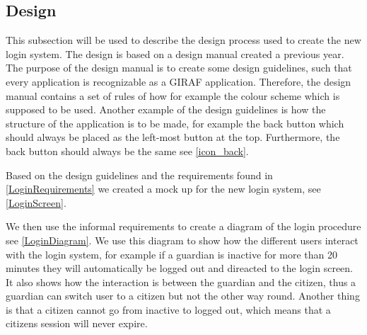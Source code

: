 \subsection{Design}

This subsection will be used to describe the design process used to create the
new login system. The design is based on a design manual created a previous
year. The purpose of the design manual is to create some design guidelines, such
that every application is recognizable as a GIRAF application. Therefore, the
design manual contains a set of rules of how for example the colour scheme which
is supposed to be used. Another example of the design guidelines is how the
structure of the application is to be made, for example the back button which
should always be placed as the left-most button at the top. Furthermore, the
back button should always be the same see \autoref{icon_back}.


Based on the design guidelines and the requirements found in
\autoref{LoginRequirements} we created a mock up for the new login system, see
\autoref{LoginScreen}.


We then use the informal requirements to create a diagram of the login procedure
see \autoref{LoginDiagram}. We use this diagram to show how the
different users interact with the login system, for example if a guardian is inactive for
more than 20 minutes they will automatically be logged out and direacted to the
login screen.\\
It also shows how the interaction is between the guardian and the citizen, thus a
guardian can switch user to a citizen but not the other way round. Another thing
is that a citizen cannot go from inactive to logged out, which means that a citizens session will never expire.

